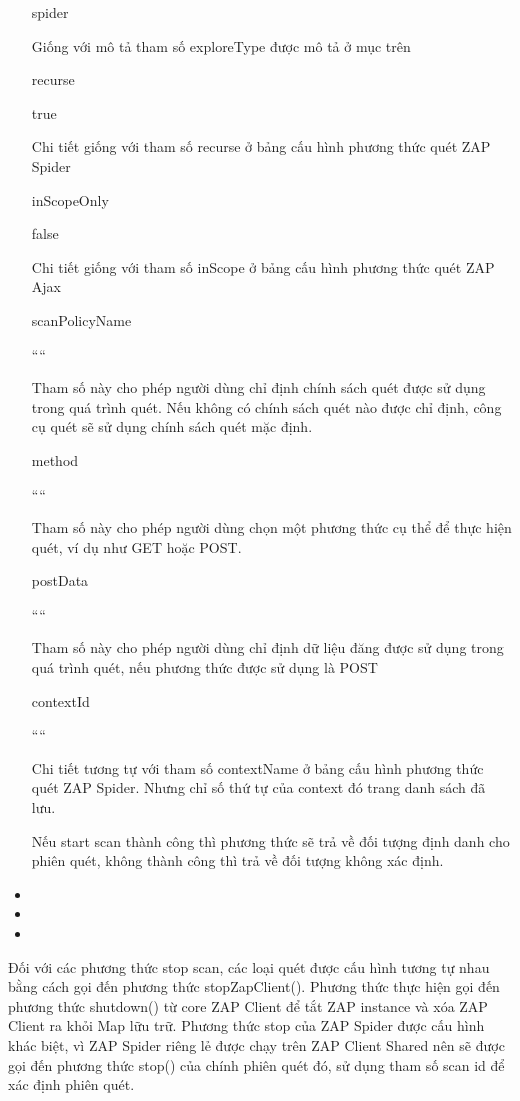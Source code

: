 \begin{itemize}
spider

Giống với mô tả tham số exploreType được mô tả ở mục trên

recurse

true

Chi tiết giống với tham số recurse ở bảng cấu hình phương thức quét ZAP Spider

inScopeOnly

false

Chi tiết giống với tham số inScope ở bảng cấu hình phương thức quét ZAP Ajax

scanPolicyName

““

Tham số này cho phép người dùng chỉ định chính sách quét được sử dụng trong quá trình quét. Nếu không có chính sách quét nào được chỉ định, công cụ quét sẽ sử dụng chính sách quét mặc định.

method

““

Tham số này cho phép người dùng chọn một phương thức cụ thể để thực hiện quét, ví dụ như GET hoặc POST.

postData

““

Tham số này cho phép người dùng chỉ định dữ liệu đăng được sử dụng trong quá trình quét, nếu phương thức được sử dụng là POST

contextId

““

Chi tiết tương tự với tham số contextName ở bảng cấu hình phương thức quét ZAP Spider. Nhưng chỉ số thứ tự của context đó trang danh sách đã lưu.

Nếu start scan thành công thì phương thức sẽ trả về đối tượng định danh cho phiên quét, không thành công thì trả về đối tượng không xác định.
\item 
\item 
\item 
\end{itemize}

Đối với các phương thức stop scan, các loại quét được cấu hình tương tự nhau bằng cách gọi đến phương thức stopZapClient(). Phương thức thực hiện gọi đến phương thức shutdown() từ core ZAP Client để tắt ZAP instance và xóa ZAP Client ra khỏi Map lữu trữ. Phương thức stop của ZAP Spider được cấu hình khác biệt, vì ZAP Spider riêng lẻ được chạy trên ZAP Client Shared nên sẽ được gọi đến phương thức stop() của chính phiên quét đó, sử dụng tham số scan id để xác định phiên quét.
\par

